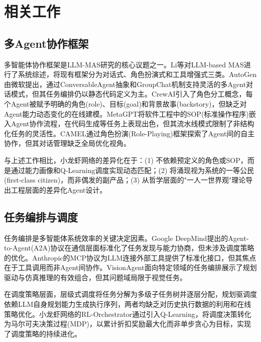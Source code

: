 \documentclass[12pt,a4paper]{ctexart}
\begin{document}
\section{相关工作}

\subsection{多Agent协作框架}

多智能体协作框架是LLM-MAS研究的核心议题之一。Li等\cite{li2024survey}对LLM-based MAS进行了系统综述，将现有框架分为对话式、角色扮演式和工具增强式三类。AutoGen\cite{wu2023autogen}由微软提出，通过ConversableAgent抽象和GroupChat机制支持灵活的多Agent对话模式，但其任务编排仍以静态代码定义为主。CrewAI\cite{crewai2024}引入了角色分工概念，每个Agent被赋予明确的角色(role)、目标(goal)和背景故事(backstory)，但缺乏对Agent能力动态变化的在线建模。MetaGPT\cite{hong2024metagpt}将软件工程中的SOP(标准操作程序)嵌入Agent协作流程，在代码生成等任务上表现出色，但其流水线模式限制了非结构化任务的灵活性。CAMEL\cite{li2023camel}通过角色扮演(Role-Playing)框架探索了Agent间的自主协作，但其对话管理缺乏全局优化视角。

与上述工作相比，小龙虾网络的差异化在于：(1) 不依赖预定义的角色或SOP，而是通过能力画像和Q-Learning调度实现动态匹配；(2) 将涌现视为系统的一等公民(first-class citizen)，而非偶发的副产品；(3) 从哲学层面的"一人一世界观"理论导出工程层面的差异化Agent设计。

\subsection{任务编排与调度}

任务编排是多智能体系统效率的关键决定因素。Google DeepMind\cite{google2025a2a}提出的Agent-to-Agent(A2A)协议在通信层面标准化了任务发现与能力协商，但未涉及调度策略的优化。Anthropic\cite{anyscale2024mcp}的MCP协议为LLM连接外部工具提供了标准化接口，但其焦点在于工具调用而非Agent间协作。VisionAgent\cite{gupta2025visionagent}面向特定领域的任务编排展示了规划驱动与仿真推理的有效组合，但其问题域局限于视觉任务。

在调度策略层面，层级式调度\cite{liu2024hierarchical}将任务分解为多级子任务树并逐层分配，规划驱调度\cite{wang2024planning}依赖LLM自身规划能力生成执行序列，两者均缺乏对历史执行数据的利用和在线策略优化。小龙虾网络的RL-Orchestrator通过引入Q-Learning\cite{watkins1992qlearning}，将调度决策转化为马尔可夫决策过程(MDP)，以累计折扣奖励最大化而非单步贪心为目标，实现了调度策略的持续进化。
\end{document}
